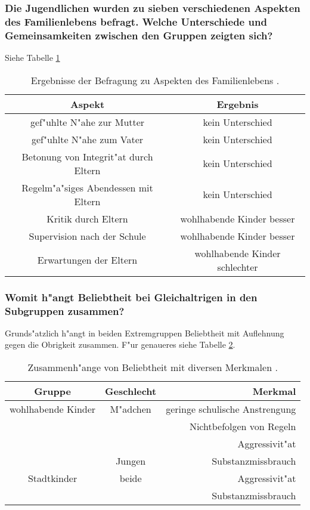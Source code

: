 \subsubsection{Die Jugendlichen wurden zu sieben verschiedenen Aspekten des Familienlebens befragt. Welche Unterschiede und Gemeinsamkeiten zwischen den Gruppen zeigten sich?}
Siehe Tabelle \ref{tab:familyaspects}
\begin{table}[hb!]
        \centering
        \begin{tabular}{c | c}
                \hline
                Aspekt & Ergebnis\\
                \hline
                gef"uhlte N"ahe zur Mutter & kein Unterschied\\
                gef"uhlte N"ahe zum Vater & kein Unterschied\\
                Betonung von Integrit"at durch Eltern & kein Unterschied\\
                Regelm"a"siges Abendessen mit Eltern & kein Unterschied\\
                \hline
                Kritik durch Eltern & wohlhabende Kinder besser\\
                Supervision nach der Schule & wohlhabende Kinder besser\\
                \hline
                Erwartungen der Eltern & wohlhabende Kinder schlechter\\
                \hline
        \end{tabular}
        \caption{Ergebnisse der Befragung zu Aspekten des Familienlebens \parencite{luthar_children_2005}.}
        \label{tab:familyaspects}
\end{table}

\subsubsection{Womit h"angt Beliebtheit bei Gleichaltrigen in den Subgruppen zusammen?}
Grunds"atzlich h"angt in beiden Extremgruppen Beliebtheit mit Auflehnung gegen die Obrigkeit zusammen. F"ur genaueres siehe Tabelle \ref{tab:peerstatus}.
\begin{table}
        \centering
        \begin{tabular}{c | c | r}
                \hline
                Gruppe & Geschlecht & Merkmal\\
                \hline
                \hline
                wohlhabende Kinder & M"adchen & geringe schulische Anstrengung\\
                & & Nichtbefolgen von Regeln\\
                & & Aggressivit"at\\
                & Jungen & Substanzmissbrauch\\
                \hline
                Stadtkinder & beide & Aggressivit"at\\
                & & Substanzmissbrauch\\
                \hline
        \end{tabular}
        \caption{Zusammenh"ange von Beliebtheit mit diversen Merkmalen \parencite{luthar_children_2005}.}
        \label{tab:peerstatus}
\end{table}

